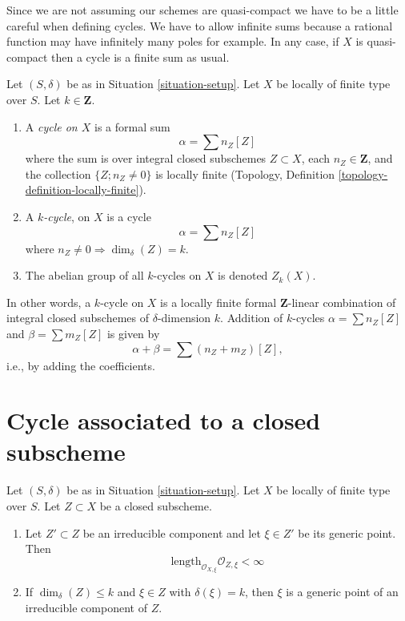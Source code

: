 \noindent
Since we are not assuming our schemes are quasi-compact we have
to be a little careful when defining cycles. We have to allow
infinite sums because a rational function may have infinitely many
poles for example. In any case, if $X$ is quasi-compact then a
cycle is a finite sum as usual.

\begin{definition}
\label{definition-cycles}
Let $(S, \delta)$ be as in Situation \ref{situation-setup}.
Let $X$ be locally of finite type over $S$.
Let $k \in \mathbf{Z}$.
\begin{enumerate}
\item A {\it cycle on $X$} is a formal sum
$$
\alpha = \sum n_Z [Z]
$$
where the sum is over integral closed subschemes $Z \subset X$,
each $n_Z \in \mathbf{Z}$, and the collection
$\{Z; n_Z \not = 0\}$ is locally finite
(Topology, Definition \ref{topology-definition-locally-finite}).
\item A {\it $k$-cycle}, on $X$ is
a cycle
$$
\alpha = \sum n_Z [Z]
$$
where $n_Z \not = 0 \Rightarrow \dim_\delta(Z) = k$.
\item The abelian group of all $k$-cycles on $X$ is denoted $Z_k(X)$.
\end{enumerate}
\end{definition}

\noindent
In other words, a $k$-cycle on $X$
is a locally finite formal $\mathbf{Z}$-linear
combination of integral closed subschemes of $\delta$-dimension $k$.
Addition of $k$-cycles $\alpha = \sum n_Z[Z]$ and
$\beta = \sum m_Z[Z]$ is given by
$$
\alpha + \beta = \sum (n_Z + m_Z)[Z],
$$
i.e., by adding the coefficients.




\section{Cycle associated to a closed subscheme}
\label{section-cycle-of-closed-subscheme}

\begin{lemma}
\label{lemma-multiplicity-finite}
Let $(S, \delta)$ be as in Situation \ref{situation-setup}.
Let $X$ be locally of finite type over $S$.
Let $Z \subset X$ be a closed subscheme.
\begin{enumerate}
\item Let $Z' \subset Z$ be an irreducible component and
let $\xi \in Z'$ be its generic point.
Then
$$
\text{length}_{\mathcal{O}_{X, \xi}} \mathcal{O}_{Z, \xi} < \infty
$$
\item If $\dim_\delta(Z) \leq k$ and $\xi \in Z$ with
$\delta(\xi) = k$, then $\xi$ is a generic point of an
irreducible component of $Z$.
\end{enumerate}
\end{lemma}

